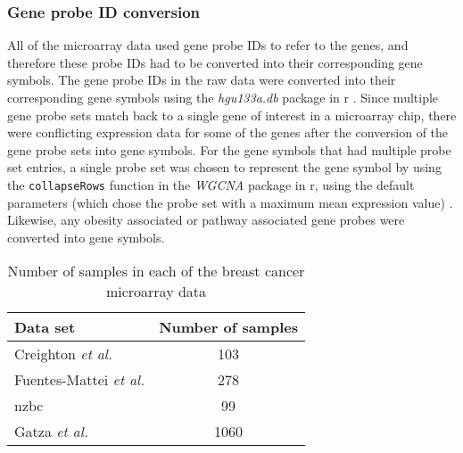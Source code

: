 \subsubsection{Gene probe ID conversion}
\label{ssub:gene_probe_id_conversion}

All of the microarray data used gene probe IDs to refer to the genes, and therefore these probe IDs had to be converted into their corresponding gene symbols.
The gene probe IDs in the raw data were converted into their corresponding gene symbols using the \textit{hgu133a.db} package in \gls{r} \citep{hgu133}.
Since multiple gene probe sets match back to a single gene of interest in a microarray chip, there were conflicting expression data for some of the genes after the conversion of the gene probe sets into gene symbols.
For the gene symbols that had multiple probe set entries, a single probe set was chosen to represent the gene symbol by using the \texttt{collapseRows} function in the \textit{WGCNA} package in \gls{r}, using the default parameters (which chose the probe set with a maximum mean expression value) \citep{Langfelder2008}.
Likewise, any obesity associated or pathway associated gene probes were converted into gene symbols.

\begin{table}[htpb]
	\centering
	\caption{Number of samples in each of the breast cancer microarray data}
	\label{tab:num_sample_microarray}
	\begin{tabular}{lc}
		Data set & Number of samples\\
		\hline
		\hline
		\rule{0pt}{2.25ex}Creighton \textit{et al.} & 103\\
		Fuentes-Mattei \textit{et al.}              & 278\\
		\gls{nzbc}                                  & 99 \\
		Gatza \textit{et al.}                       & 1060\\
		\hline
		\hline
	\end{tabular}
\end{table}

